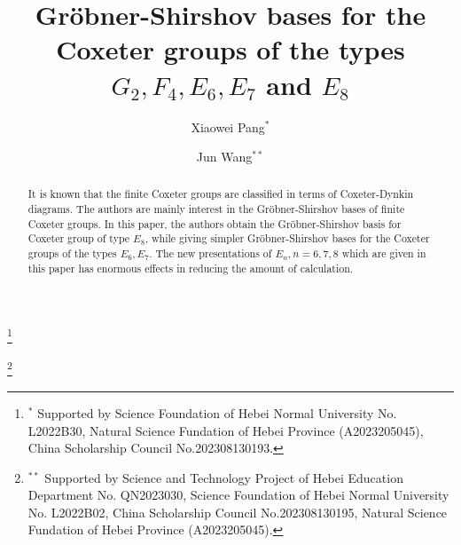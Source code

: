 \documentclass[UTF8]{amsart}
\theoremstyle{definition}
\theoremstyle{remark}
\numberwithin{equation}{section}
\begin{document}
\title{Gr\"{o}bner-Shirshov bases  for the Coxeter groups of the types  $G_2,F_4,E_6,E_7$ and $E_8$ }






\author[Xiaowei Pang]{Xiaowei Pang$^{*}$}
\thanks{$^{*}$ Supported by Science Foundation of Hebei Normal University No. L2022B30, Natural Science Fundation of Hebei Province (A2023205045), China Scholarship Council No.202308130193.}
\address{$^{*}$ \;Hebei Normal University\\
		Hebei Key Laboratory of Computational Mathematics and Applications\\
Hebei Research Center of the Basic Discipline Pure Mathematics}


\author[Jun Wang]{Jun Wang$^{**}$}
\thanks{$^{**}$ Supported by  Science and Technology Project of Hebei Education Department  No. QN2023030, Science Foundation of Hebei Normal University No. L2022B02, China Scholarship Council No.202308130195, Natural Science Fundation of Hebei Province (A2023205045).}

\address{$^{**}$ \;Hebei Normal University\\
		Hebei Key Laboratory of Computational Mathematics and Applications\\
		Hebei Center for Applied Mathematics\\
		Hebei International Joint Research Center for Mathematics and Interdisciplinary Science\\
Hebei Research Center of the Basic Discipline Pure Mathematics}


\maketitle

\begin{abstract}
 It is known that the finite Coxeter groups are classified in terms of Coxeter-Dynkin diagrams. The authors are mainly interest in the Gr\"{o}bner-Shirshov bases of finite Coxeter groups. In this paper, the authors obtain the Gr\"{o}bner-Shirshov basis for Coxeter group of type $E_8$,  while giving simpler Gr\"{o}bner-Shirshov bases for the Coxeter groups of the types $E_6,E_7$.  The new presentations of $E_n, n=6,7,8$ which are given in this paper has enormous effects in reducing the amount of calculation.
\end{abstract}
\end{document}
